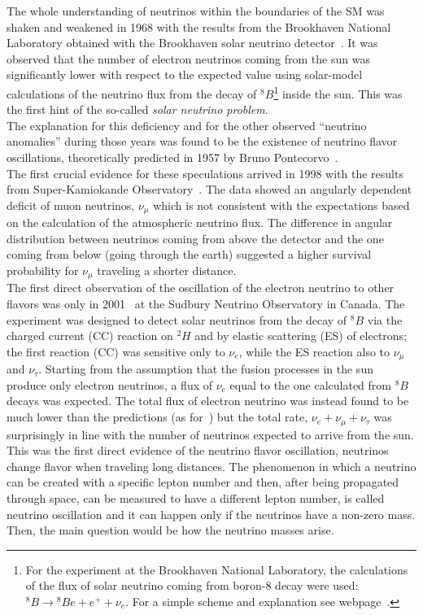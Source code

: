 The whole understanding of neutrinos within the boundaries of the SM was shaken and weakened in 1968 with the results from the Brookhaven National Laboratory obtained with the Brookhaven solar neutrino detector~\cite{PhysRevLett.20.1205}.
It was observed that the number of electron neutrinos coming from the sun was significantly lower with respect to the expected value using solar-model calculations of the neutrino flux from the decay of ${}^{8}B$\footnote{For the experiment at the Brookhaven National Laboratory, the calculations of the flux of solar neutrino coming from boron-8 decay were used: ${}^{8}B\rightarrow {}^{8}Be + e^{+} + \nu_e$. For a simple scheme and explanation see webpage~\cite{webpage_boron}.} inside the sun. This was the first hint of the so-called \emph{solar neutrino problem}.\\
The explanation for this deficiency and for the other observed ``neutrino anomalies'' during those years was found to be the existence of neutrino flavor oscillations, theoretically predicted in 1957 by Bruno Pontecorvo~\cite{osti_4343073}. \\
The first crucial evidence for these speculations arrived in 1998 with the results from Super-Kamiokande Observatory~\cite{Fukuda_1998}. The data showed an angularly dependent deficit of muon neutrinos, $\nu_{\mu}$ which is not consistent with the expectations based on the calculation of the atmospheric neutrino flux. The difference in angular distribution between neutrinos coming from above the detector and the one coming from below (going through the earth) suggested a higher survival probability for $\nu_{\mu}$ traveling a shorter distance.\\
The first direct observation of the oscillation of the electron neutrino to other flavors was only in 2001~\cite{Ahmad_2001} at the Sudbury Neutrino Observatory in Canada. The experiment was designed to detect solar neutrinos from the decay of ${}^{8}B$ via the charged current (CC) reaction on ${}^{2}H$ and by elastic scattering (ES) of electrons; the first reaction (CC) was sensitive only to $\nu_e$, while the ES reaction also to  $\nu_{\mu}$ and $\nu_{\tau}$. Starting from the assumption that the fusion processes in the sun produce only electron neutrinos, a flux of $\nu_{e}$ equal to the one calculated from ${}^{8}B$  decays was expected. The total flux of electron neutrino was instead found to be much lower than the predictions (as for~\cite{PhysRevLett.20.1205}) but the total rate, $\nu_{e} + \nu_{\mu} + \nu_{\tau}$ was surprisingly in line with the number of neutrinos expected to arrive from the sun. This was the first direct evidence of the neutrino flavor oscillation, \ie neutrinos change flavor when traveling long distances. The phenomenon in which a neutrino can be created with a specific lepton number and then, after being propagated through space, can be measured to have a different lepton number, is called neutrino oscillation and it can happen only if the neutrinos have a non-zero mass. Then, the main question would be how the neutrino masses arise.

